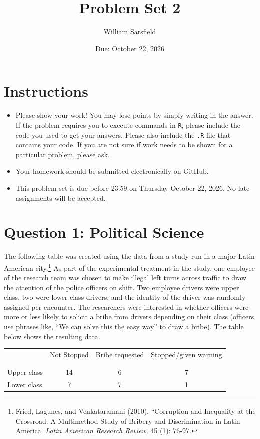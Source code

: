 \documentclass[12pt,letterpaper]{article}
\title{Problem Set 2}
\date{Due: October 22, 2026}
\author{William Sarsfield}
\begin{document}
	\maketitle
	\section*{Instructions}
\begin{itemize}
	\item Please show your work! You may lose points by simply writing in the answer. If the problem requires you to execute commands in \texttt{R}, please include the code you used to get your answers. Please also include the \texttt{.R} file that contains your code. If you are not sure if work needs to be shown for a particular problem, please ask.
	\item Your homework should be submitted electronically on GitHub.
	\item This problem set is due before 23:59 on Thursday October 22, 2026. No late assignments will be accepted.

\end{itemize}

	
	\vspace{.5cm}
	\section*{Question 1: Political Science}
		\vspace{.25cm}
	The following table was created using the data from a study run in a major Latin American city.\footnote{Fried, Lagunes, and Venkataramani (2010). ``Corruption and Inequality at the Crossroad: A Multimethod Study of Bribery and Discrimination in Latin America. \textit{Latin American Research Review}. 45 (1): 76-97.} As part of the experimental treatment in the study, one employee of the research team was chosen to make illegal left turns across traffic to draw the attention of the police officers on shift. Two employee drivers were upper class, two were lower class drivers, and the identity of the driver was randomly assigned per encounter. The researchers were interested in whether officers were more or less likely to solicit a bribe from drivers depending on their class (officers use phrases like, ``We can solve this the easy way'' to draw a bribe). The table below shows the resulting data.

\newpage
\begin{table}[h!]
	\centering
	\begin{tabular}{l | c c c }
		& Not Stopped & Bribe requested & Stopped/given warning \\
		\\[-1.8ex] 
		\hline \\[-1.8ex]
		Upper class & 14 & 6 & 7 \\
		Lower class & 7 & 7 & 1 \\
		\hline
	\end{tabular}
\end{table}
\end{document}
